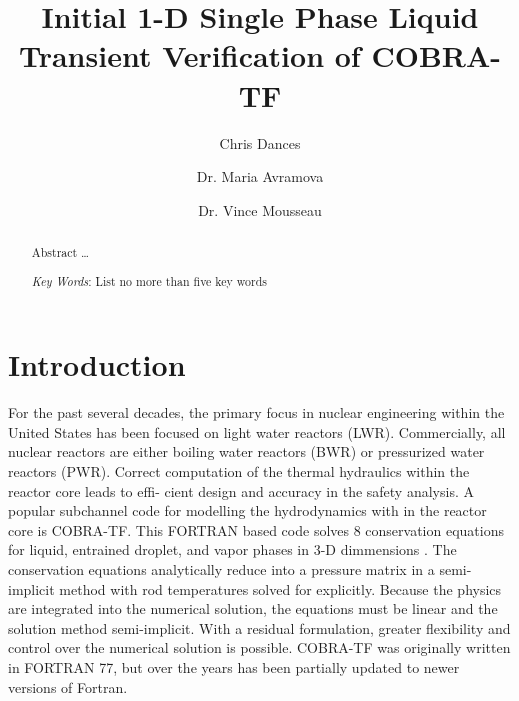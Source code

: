 \documentclass{mc2015}
\begin{document}
\title{Initial 1-D Single Phase Liquid Transient Verification of COBRA-TF}

\author{Chris Dances}
\author{Dr. Maria Avramova}

\author{Dr. Vince Mousseau}

\maketitle

\begin{abstract}
Abstract \ldots

\emph{Key Words}: List no more than five key words
\end{abstract}

\clearpage

\tableofcontents
\clearpage

\listoffigures
\clearpage

\section{Introduction}

\cite{Roy:2005:RCS:1082892.1082899}

For the past several decades, the primary focus in nuclear engineering within
the United States has been focused on light water reactors (LWR). Commercially,
all nuclear reactors are either boiling water reactors (BWR) or pressurized
water reactors (PWR). Correct computation of the thermal hydraulics within the
reactor core leads to effi- cient design and accuracy in the safety analysis. A
popular subchannel code for modelling the hydrodynamics with in the reactor core
is COBRA-TF. This FORTRAN based code solves 8 conservation equations for liquid,
entrained droplet, and vapor phases in 3-D dimmensions \cite{CTF_Theory}. The
conservation equations analytically reduce into a pressure matrix in a 
semi-implicit  method with rod temperatures solved for explicitly. Because the 
physics are integrated into the numerical solution, the equations  must be
linear and the solution method semi-implicit. With a residual formulation,
greater flexibility and control over the numerical solution is possible.
COBRA-TF was originally written in FORTRAN 77, but over the years has been
partially updated to newer versions of Fortran.
\end{document}
